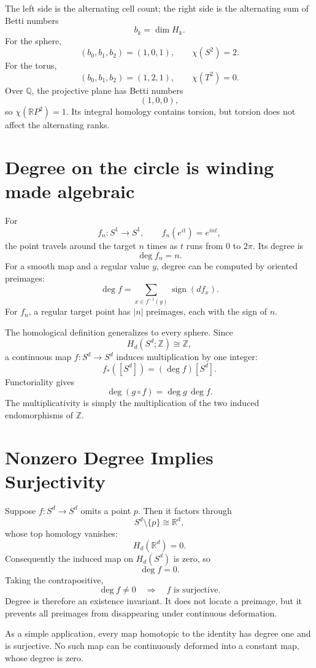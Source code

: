 The left side is the alternating cell count; the right side is the alternating sum of Betti numbers
\[
  b_k=\dim H_k.
\]
For the sphere,
\[
  (b_0,b_1,b_2)=(1,0,1),
  \qquad
  \chi(S^2)=2.
\]
For the torus,
\[
  (b_0,b_1,b_2)=(1,2,1),
  \qquad
  \chi(T^2)=0.
\]
Over \(\mathbb Q\), the projective plane has Betti numbers
\[
  (1,0,0),
\]
so \(\chi(\mathbb RP^2)=1\).  Its integral homology contains torsion, but torsion does not affect the alternating ranks.

\section{Degree on the circle is winding made algebraic}

For
\[
  f_n:S^1\to S^1,
  \qquad
  f_n(e^{it})=e^{int},
\]
the point travels around the target \(n\) times as \(t\) runs from \(0\) to \(2\pi\).  Its degree is
\[
  \deg f_n=n.
\]
For a smooth map and a regular value \(y\), degree can be computed by oriented preimages:
\[
  \deg f
  =\sum_{x\in f^{-1}(y)}\operatorname{sign}(df_x).
\]
For \(f_n\), a regular target point has \(|n|\) preimages, each with the sign of \(n\).

The homological definition generalizes to every sphere.  Since
\[
  H_d(S^d;\mathbb Z)\cong\mathbb Z,
\]
a continuous map \(f:S^d\to S^d\) induces multiplication by one integer:
\[
  f_*([S^d])=(\deg f)[S^d].
\]
Functoriality gives
\[
  \deg(g\circ f)=\deg g\,\deg f.
\]
The multiplicativity is simply the multiplication of the two induced endomorphisms of \(\mathbb Z\).

\section{Nonzero Degree Implies Surjectivity}

Suppose \(f:S^d\to S^d\) omits a point \(p\).  Then it factors through
\[
  S^d\setminus\{p\}\cong\mathbb R^d,
\]
whose top homology vanishes:
\[
  H_d(\mathbb R^d)=0.
\]
Consequently the induced map on \(H_d(S^d)\) is zero, so
\[
  \deg f=0.
\]
Taking the contrapositive,
\[
  \boxed{
  \deg f\ne0
  \quad\Longrightarrow\quad
  f\text{ is surjective}.}
\]
Degree is therefore an existence invariant.  It does not locate a preimage, but it prevents all preimages from disappearing under continuous deformation.

As a simple application, every map homotopic to the identity has degree one and is surjective.  No such map can be continuously deformed into a constant map, whose degree is zero.

